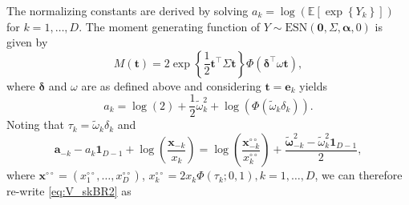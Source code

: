 \documentclass[12pt]{article}
\begin{document}
% 
The normalizing constants are derived by solving $a_k = \log\left( \mathbb{E} \left[ \exp \left\{ Y_k\right\}\right]\right)$ for $k=1, \ldots, D$. The moment generating function of $Y \sim \text{ESN}(\bm 0, \Sigma, \bm \alpha, 0)$ is given by
%
$$
M(\bm t)  = 2 \exp \left\{ \frac{1}{2} \bm t^\top \Sigma \bm t \right\} \Phi\left( \bm \delta^\top \omega \bm t\right),
$$
%
where $\bm \delta$ and $\omega$ are as defined above and considering $\bm t = \bm e_k$ yields 
%
$$
a_k = \log(2) + \frac{1}{2} \tilde{\omega}_k^2 + \log \left( \Phi\left( \tilde{\omega}_{k} \delta_k \right)\right).
$$
Noting that $\tau_k = \tilde{\omega}_k \delta_k$ and
%
$$
\bm a_{-k}-a_{k} \bm 1_{D-1}+\log \left(\frac{\bm x_{-k}}{x_k}\right)
= \log \left( \frac{\bm x^{\circ\circ}_{-k}}{x^{\circ\circ}_k} \right) + \frac{\tilde{\bm \omega}_{-k}^2 - \tilde{\omega}_k^2\bm 1_{D-1}}{2},
$$
where $\bm x^{\circ\circ} = \left( x^{\circ\circ}_1, \ldots, x^{\circ\circ}_D\right)$, $x^{\circ\circ}_k = 2x_k \Phi\left( \tau_k; 0, 1 \right), k=1, \ldots, D$,
we can therefore re-write \eqref{eq:V_skBR2} as
%
\end{document}
